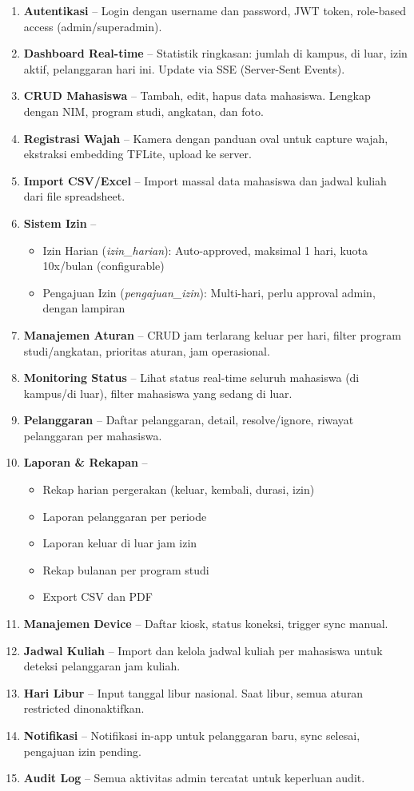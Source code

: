 \documentclass[12pt,a4paper]{article}
\begin{document}
\begin{enumerate}[nolistsep]
  \item \textbf{Autentikasi} -- Login dengan username dan password, JWT token, role-based access (admin/superadmin).
  \item \textbf{Dashboard Real-time} -- Statistik ringkasan: jumlah di kampus, di luar, izin aktif, pelanggaran hari ini. Update via SSE (Server-Sent Events).
  \item \textbf{CRUD Mahasiswa} -- Tambah, edit, hapus data mahasiswa. Lengkap dengan NIM, program studi, angkatan, dan foto.
  \item \textbf{Registrasi Wajah} -- Kamera dengan panduan oval untuk capture wajah, ekstraksi embedding TFLite, upload ke server.
  \item \textbf{Import CSV/Excel} -- Import massal data mahasiswa dan jadwal kuliah dari file spreadsheet.
  \item \textbf{Sistem Izin} --
    \begin{itemize}[nolistsep]
      \item Izin Harian (\textit{izin\_harian}): Auto-approved, maksimal 1 hari, kuota 10x/bulan (configurable)
      \item Pengajuan Izin (\textit{pengajuan\_izin}): Multi-hari, perlu approval admin, dengan lampiran
    \end{itemize}
  \item \textbf{Manajemen Aturan} -- CRUD jam terlarang keluar per hari, filter program studi/angkatan, prioritas aturan, jam operasional.
  \item \textbf{Monitoring Status} -- Lihat status real-time seluruh mahasiswa (di kampus/di luar), filter mahasiswa yang sedang di luar.
  \item \textbf{Pelanggaran} -- Daftar pelanggaran, detail, resolve/ignore, riwayat pelanggaran per mahasiswa.
  \item \textbf{Laporan \& Rekapan} --
    \begin{itemize}[nolistsep]
      \item Rekap harian pergerakan (keluar, kembali, durasi, izin)
      \item Laporan pelanggaran per periode
      \item Laporan keluar di luar jam izin
      \item Rekap bulanan per program studi
      \item Export CSV dan PDF
    \end{itemize}
  \item \textbf{Manajemen Device} -- Daftar kiosk, status koneksi, trigger sync manual.
  \item \textbf{Jadwal Kuliah} -- Import dan kelola jadwal kuliah per mahasiswa untuk deteksi pelanggaran jam kuliah.
  \item \textbf{Hari Libur} -- Input tanggal libur nasional. Saat libur, semua aturan restricted dinonaktifkan.
  \item \textbf{Notifikasi} -- Notifikasi in-app untuk pelanggaran baru, sync selesai, pengajuan izin pending.
  \item \textbf{Audit Log} -- Semua aktivitas admin tercatat untuk keperluan audit.
\end{enumerate}
\end{document}

